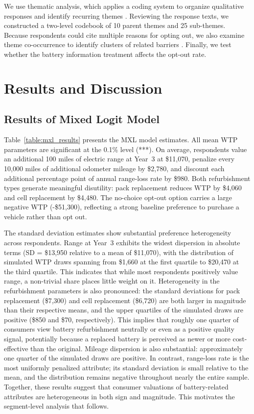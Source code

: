 \documentclass[a4paper,fleqn]{cas-sc}   %
\begin{document}
We use thematic analysis, which applies a coding system to organize qualitative responses and identify recurring themes \parencite{braunUsingThematicAnalysis2006}. Reviewing the response texts, we constructed a two-level codebook of 10 parent themes and 25 sub-themes. Because respondents could cite multiple reasons for opting out,  we also examine theme co-occurrence to identify clusters of related barriers \parencite{krishnaUnderstandingIdentifyingBarriers2021}. Finally, we test whether the battery information treatment affects the opt-out rate.

\section{Results and Discussion}
\label{section:results}

\subsection{Results of Mixed Logit Model}

Table~\ref{table:mxl_results} presents the MXL model estimates. All mean WTP parameters are significant at the 0.1\% level (***). On average, respondents value an additional 100 miles of electric range at Year~3 at \$11,070, penalize every 10,000 miles of additional odometer mileage by \$2,780, and discount each additional percentage point of annual range-loss rate by \$980. Both refurbishment types generate meaningful disutility: pack replacement reduces WTP by \$4,060 and cell replacement by \$4,480. The no-choice opt-out option carries a large negative WTP (-\$51,300), reflecting a strong baseline preference to purchase a vehicle rather than opt out.

The standard deviation estimates show substantial preference heterogeneity across respondents. Range at Year~3 exhibits the widest dispersion in absolute terms (SD = \$13,950 relative to a mean of \$11,070), with the distribution of simulated WTP draws spanning from \$1,660 at the first quartile to \$20,470 at the third quartile. This indicates that while most respondents positively value range, a non-trivial share places little weight on it. Heterogeneity in the refurbishment parameters is also pronounced: the standard deviations for pack replacement (\$7,300) and cell replacement (\$6,720) are both larger in magnitude than their respective means, and the upper quartiles of the simulated draws are positive (\$850 and \$70, respectively). This implies that roughly one quarter of consumers view battery refurbishment neutrally or even as a positive quality signal, potentially because a replaced battery is perceived as newer or more cost-effective than the original. Mileage dispersion is also substantial: approximately one quarter of the simulated draws are positive. In contrast, range-loss rate is the most uniformly penalized attribute; its standard deviation is small relative to the mean, and the distribution remains negative throughout nearly the entire sample. Together, these results suggest that consumer valuations of battery-related attributes are heterogeneous in both sign and magnitude. This motivates the segment-level analysis that follows.
\end{document}
